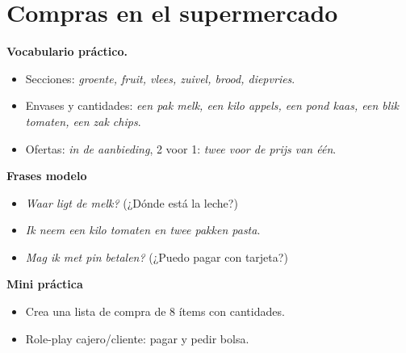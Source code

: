 \section{Compras en el supermercado}
\textbf{Vocabulario práctico.}
\begin{itemize}[leftmargin=*]
  \item Secciones: \textit{groente, fruit, vlees, zuivel, brood, diepvries}.
  \item Envases y cantidades: \textit{een pak melk, een kilo appels, een pond kaas, een blik tomaten, een zak chips}.
  \item Ofertas: \textit{in de aanbieding}, 2 voor 1: \textit{twee voor de prijs van één}.
\end{itemize}

\textbf{Frases modelo}
\begin{itemize}[leftmargin=*]
  \item \textit{Waar ligt de melk?} (¿Dónde está la leche?)
  \item \textit{Ik neem een kilo tomaten en twee pakken pasta}.
  \item \textit{Mag ik met pin betalen?} (¿Puedo pagar con tarjeta?)
\end{itemize}

\textbf{Mini práctica}
\begin{itemize}[leftmargin=*]
  \item Crea una lista de compra de 8 ítems con cantidades.
  \item Role-play cajero/cliente: pagar y pedir bolsa.
\end{itemize}
